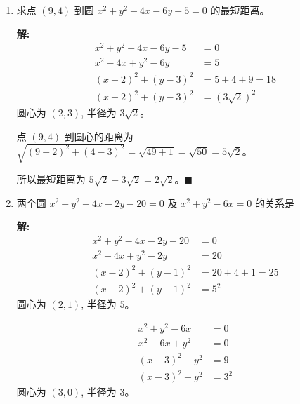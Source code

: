 \documentclass[10pt]{article}
\newcommand{\sol}{\textbf{解:} }
\begin{document}
\begin{enumerate}[leftmargin=*]
        \sol{}
        \begin{align*}
          x^2 + y^2 - 6x - 4y + 4 & = 0              \\
          x^2 - 6x + y^2 - 4y     & = -4             \\
          (x-3)^2 + (y-2)^2       & = -4 + 9 + 4 = 9 \\
          (x-3)^2 + (y-2)^2       & = 3^2
        \end{align*}
        圆心为 $(3, 2)$, 半径为 $3$。

        点 $(6, 6)$ 到圆心的距离为 $\sqrt{(6-3)^{2}+(6-2)^{2}} = \sqrt{9+16} = 5$。

        所以最短距离为 $5-3 = 2$。\hfill$\blacksquare$

  \item 求点 $(9,4)$ 到圆 $x^{2}+y^{2}-4 x-6 y-5=0$ 的最短距离。

        \sol{}
        \begin{align*}
          x^2 + y^2 - 4x - 6y - 5 & = 0              \\
          x^2 - 4x + y^2 - 6y     & = 5              \\
          (x-2)^2 + (y-3)^2       & = 5 + 4 + 9 = 18 \\
          (x-2)^2 + (y-3)^2       & = (3\sqrt{2})^2
        \end{align*}
        圆心为 $(2, 3)$, 半径为 $3\sqrt{2}$。

        点 $(9, 4)$ 到圆心的距离为 $\sqrt{(9-2)^{2}+(4-3)^{2}} = \sqrt{49+1} = \sqrt{50} = 5\sqrt{2}$。

        所以最短距离为 $5\sqrt{2} - 3\sqrt{2} = 2\sqrt{2}$。\hfill$\blacksquare$

  \item 两个圆 $x^{2}+y^{2}-4 x-2 y-20=0$ 及 $x^{2}+y^{2}-6 x=0$ 的关系是

        \sol{}
        \begin{align*}
          x^2 + y^2 - 4x - 2y - 20 & = 0               \\
          x^2 - 4x + y^2 - 2y      & = 20              \\
          (x-2)^2 + (y-1)^2        & = 20 + 4 + 1 = 25 \\
          (x-2)^2 + (y-1)^2        & = 5^2
        \end{align*}
        圆心为 $(2, 1)$, 半径为 $5$。

        \newpage
        \begin{align*}
          x^2 + y^2 - 6x & = 0   \\
          x^2 - 6x + y^2 & = 0   \\
          (x-3)^2 + y^2  & = 9   \\
          (x-3)^2 + y^2  & = 3^2
        \end{align*}
        圆心为 $(3, 0)$, 半径为 $3$。


\end{enumerate}
\end{document}
